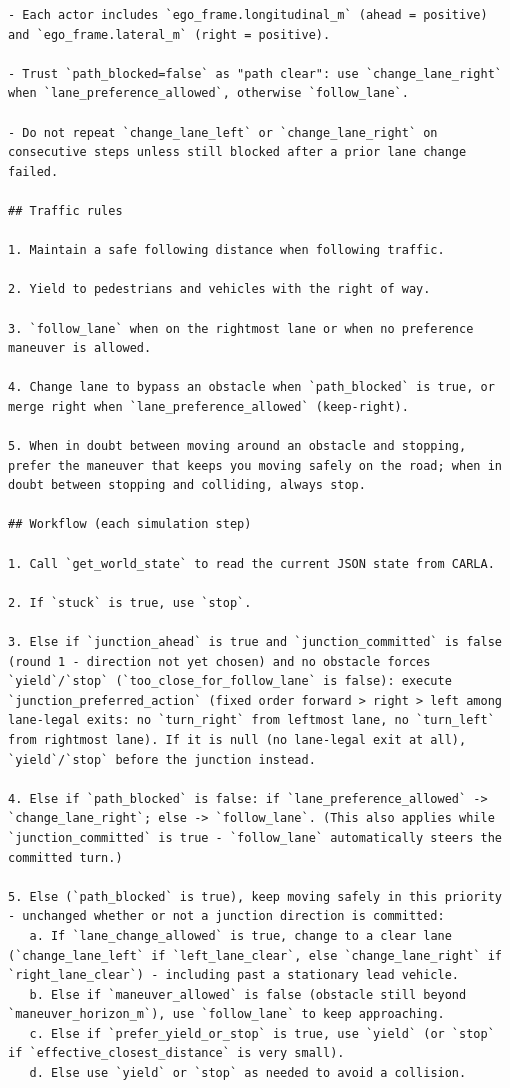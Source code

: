 \begin{Verbatim}[breaklines=true,breakanywhere=true,fontsize=\footnotesize]
- Each actor includes `ego_frame.longitudinal_m` (ahead = positive) and `ego_frame.lateral_m` (right = positive).

- Trust `path_blocked=false` as "path clear": use `change_lane_right` when `lane_preference_allowed`, otherwise `follow_lane`.

- Do not repeat `change_lane_left` or `change_lane_right` on consecutive steps unless still blocked after a prior lane change failed.

## Traffic rules

1. Maintain a safe following distance when following traffic.

2. Yield to pedestrians and vehicles with the right of way.

3. `follow_lane` when on the rightmost lane or when no preference maneuver is allowed.

4. Change lane to bypass an obstacle when `path_blocked` is true, or merge right when `lane_preference_allowed` (keep-right).

5. When in doubt between moving around an obstacle and stopping, prefer the maneuver that keeps you moving safely on the road; when in doubt between stopping and colliding, always stop.

## Workflow (each simulation step)

1. Call `get_world_state` to read the current JSON state from CARLA.

2. If `stuck` is true, use `stop`.

3. Else if `junction_ahead` is true and `junction_committed` is false (round 1 - direction not yet chosen) and no obstacle forces `yield`/`stop` (`too_close_for_follow_lane` is false): execute `junction_preferred_action` (fixed order forward > right > left among lane-legal exits: no `turn_right` from leftmost lane, no `turn_left` from rightmost lane). If it is null (no lane-legal exit at all), `yield`/`stop` before the junction instead.

4. Else if `path_blocked` is false: if `lane_preference_allowed` -> `change_lane_right`; else -> `follow_lane`. (This also applies while `junction_committed` is true - `follow_lane` automatically steers the committed turn.)

5. Else (`path_blocked` is true), keep moving safely in this priority - unchanged whether or not a junction direction is committed:
   a. If `lane_change_allowed` is true, change to a clear lane (`change_lane_left` if `left_lane_clear`, else `change_lane_right` if `right_lane_clear`) - including past a stationary lead vehicle.
   b. Else if `maneuver_allowed` is false (obstacle still beyond `maneuver_horizon_m`), use `follow_lane` to keep approaching.
   c. Else if `prefer_yield_or_stop` is true, use `yield` (or `stop` if `effective_closest_distance` is very small).
   d. Else use `yield` or `stop` as needed to avoid a collision.


\end{Verbatim}

